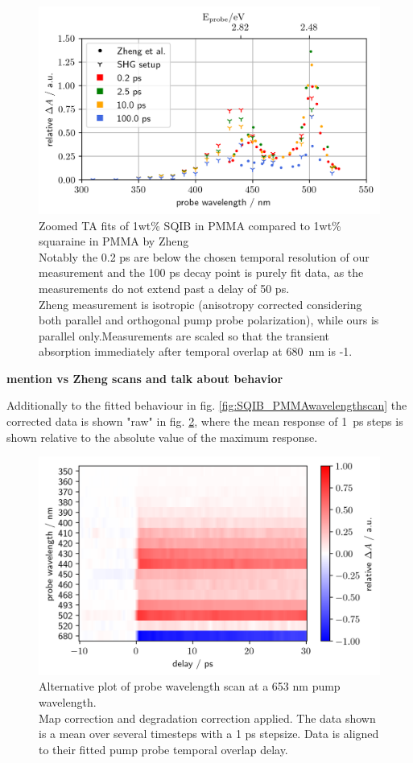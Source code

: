 \documentclass[twoside,openright]{scrreprt}
\begin{document}
\begin{figure}[hbtp]
\centering
\includegraphics[scale=1]{images/TimeResolvedWavScanvsZheng_Zoom.png}
\caption{Zoomed TA fits of 1wt\% SQIB in PMMA compared to 1wt\% squaraine in PMMA by Zheng\protect\cite{Zheng2020}\\ Notably the 0.2 ps are below the chosen temporal resolution of our measurement and the 100 ps decay point is purely fit data, as the measurements do not extend past a delay of 50 ps.\\
Zheng measurement is isotropic (anisotropy corrected considering both parallel and orthogonal pump probe polarization), while ours is parallel only.Measurements are scaled so that the transient absorption immediately after temporal overlap at \SI{680}{\nano\meter} is -1.\label{fig:TA_vsZheng_Zoomed}}
\end{figure}
\textbf{mention vs Zheng scans and talk about behavior}

Additionally to the fitted behaviour in fig. \ref{fig:SQIB_PMMAwavelengthscan} the corrected data is shown "raw" in fig. \ref{fig:SQIB_PMMA_rawWavs}, where the mean response of \SI{1}{\pico\second} steps is shown relative to the absolute value of the maximum response.
\begin{figure}[htp]
\centering
\includegraphics[scale=1]{images/RawishDataWavelengthScanSHG.png}
\caption{Alternative plot of probe wavelength scan at a 653 nm pump wavelength.\\Map correction and degradation correction applied. The data shown is a mean over several timesteps with a 1 ps stepsize. Data is aligned to their fitted pump probe temporal overlap delay.\label{fig:SQIB_PMMA_rawWavs}}
\end{figure}
\end{document}
